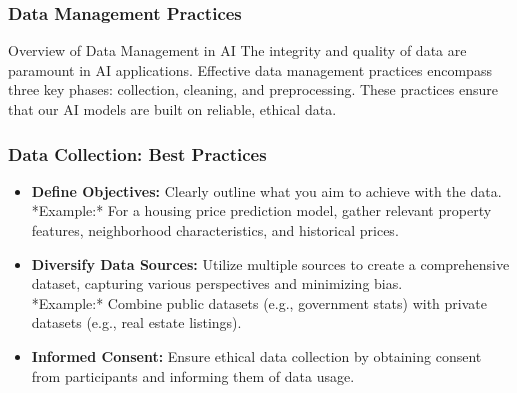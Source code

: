 \documentclass[aspectratio=169]{beamer}
\begin{document}
\begin{frame}[fragile]
    \frametitle{Data Management Practices}
    \begin{block}{Overview of Data Management in AI}
        The integrity and quality of data are paramount in AI applications. Effective data management practices encompass three key phases: collection, cleaning, and preprocessing. These practices ensure that our AI models are built on reliable, ethical data.
    \end{block}
\end{frame}

\begin{frame}[fragile]
    \frametitle{Data Collection: Best Practices}
    \begin{itemize}
        \item \textbf{Define Objectives:} Clearly outline what you aim to achieve with the data. \\
        *Example:* For a housing price prediction model, gather relevant property features, neighborhood characteristics, and historical prices.
        
        \item \textbf{Diversify Data Sources:} Utilize multiple sources to create a comprehensive dataset, capturing various perspectives and minimizing bias. \\
        *Example:* Combine public datasets (e.g., government stats) with private datasets (e.g., real estate listings).
        
        \item \textbf{Informed Consent:} Ensure ethical data collection by obtaining consent from participants and informing them of data usage.
    \end{itemize}
\end{frame}
\end{document}

